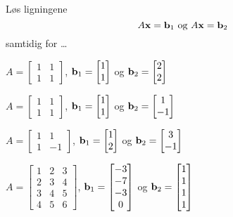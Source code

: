 \begin{oppgave}
Løs ligningene
\[
A\mathbf{x}=\mathbf{b}_1\text{ og }A\mathbf{x}=\mathbf{b}_2
\]
samtidig for \ldots


\begin{punkt}
$A=\begin{bmatrix}
1 & 1\\
1 & 1
\end{bmatrix}
$, $\mathbf{b}_1=\begin{bmatrix} 1 \\ 1 \end{bmatrix}$ og $\mathbf{b}_2=\begin{bmatrix} 2 \\ 2 \end{bmatrix}$
\end{punkt}


\begin{punkt}
$A=\begin{bmatrix}
1 & 1\\
1 & 1
\end{bmatrix}
$, $\mathbf{b}_1=\begin{bmatrix} 1 \\ 1 \end{bmatrix}$ og $\mathbf{b}_2=\begin{bmatrix} 1 \\ -1 \end{bmatrix}$
\end{punkt}


\begin{punkt}
$A=\begin{bmatrix}
1 & 1\\
1 & -1
\end{bmatrix}
$, $\mathbf{b}_1=\begin{bmatrix} 1 \\ 2 \end{bmatrix}$ og $\mathbf{b}_2=\begin{bmatrix} 3 \\ -1 \end{bmatrix}$
\end{punkt}


\begin{punkt}
$A=\begin{bmatrix}
	1 & 2 & 3\\
	2 & 3 & 4\\
	3 & 4 & 5\\
	4 & 5 & 6
	\end{bmatrix}
	$,
$\mathbf{b}_1=
	\begin{bmatrix}
	-3  \\
	-7 \\
	-3 \\
	0
	\end{bmatrix}
$ og 
$\mathbf{b}_2=
	\begin{bmatrix}
	1  \\
	1 \\
	1 \\
	1
	\end{bmatrix}
$
\end{punkt}



\end{oppgave}


